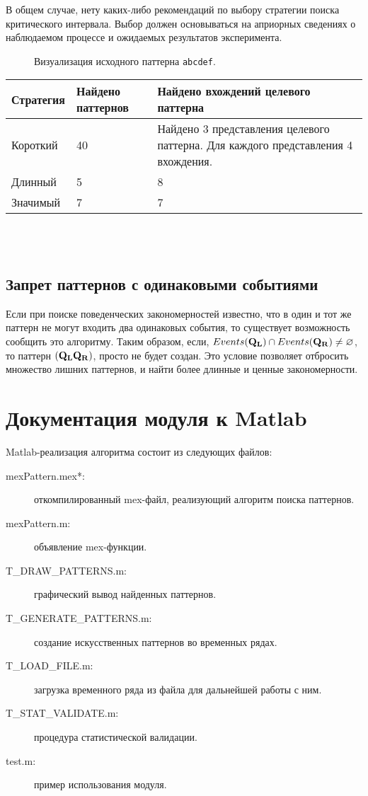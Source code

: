 В общем случае, нету каких-либо рекомендаций по выбору стратегии поиска критического интервала. Выбор должен основываться на априорных 
сведениях о наблюдаемом процессе и ожидаемых результатов эксперимента.
\begin{figure}[H]
\noindent{}
\caption{Визуализация исходного паттерна \texttt{abcdef}.}
\end{figure}

\begin{tabular}[t]{|p{6em}|p{11em}|p{21em}|}
\hline
{\bf Стратегия} & {\bf Найдено паттернов} & {\bf Найдено вхождений целевого паттерна}\\
\hline
Короткий& 40 & Найдено 3 представления целевого паттерна. Для каждого представления 4 вхождения.\\
\hline
Длинный & 5 & 8\\
\hline
Значимый & 7 & 7\\
\hline   
\end{tabular}~\\~
\subsection{Запрет паттернов с одинаковыми событиями}
Если при поиске поведенческих закономерностей известно, что в один и тот же паттерн не могут входить два одинаковых события, то существует
возможность сообщить это алгоритму. 
Таким образом, если, $Events({\bf Q_L})\cap Events({\bf Q_R})\not=\varnothing$, то паттерн $({\bf Q_L}{\bf Q_R})$, просто не 
будет создан. Это условие позволяет отбросить множество лишних паттернов, и найти более длинные и ценные закономерности. 

\section{Документация модуля к Matlab}
 Matlab-реализация алгоритма состоит из следующих файлов: 
\begin{description}
\item[mexPattern.mex*:] откомпилированный mex-файл, реализующий алгоритм поиска паттернов.
\item[mexPattern.m:] объявление mex-функции.
\item[T\_DRAW\_PATTERNS.m:] графический вывод найденных паттернов.
\item[T\_GENERATE\_PATTERNS.m:] создание искусственных паттернов во временных рядах.
\item[T\_LOAD\_FILE.m:] загрузка временного ряда из файла для дальнейшей работы с ним.
\item[T\_STAT\_VALIDATE.m:] процедура статистической валидации.
\item[test.m:] пример использования модуля.
\end{description}
